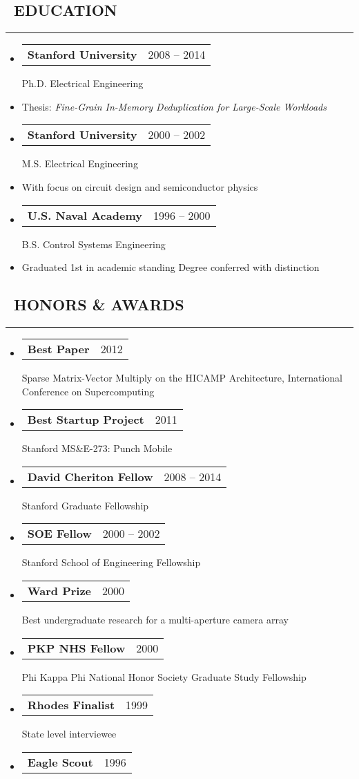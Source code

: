 \documentclass[10pt,letterpaper]{article}
\makeatletter
\newenvironment{resumesection}[1]
{%
    \subsection*{\ \textcolor{light-gray}{#1} }
    \vspace{-0.4em}
    \begin{samepage}
    \hrule
    \end{samepage}
    \vspace{+0.4em}
    \begin{itemize}[leftmargin=0.15cm]
        \parskip=0.1em
}%
{%
    \end{itemize}
}%
\newcommand{\myitem}[1]
{\item[] \textcolor{dark-gray}{#1} }
\newcommand{\headerrowx}[2]
{\item[] \begin{tabular*}{\linewidth}{l@{\extracolsep{\fill}}r}
	#1 &
	#2 \\
\end{tabular*}}
\newcommand{\headertri}[3]
{\item[] \begin{tabular*}{\linewidth}{l@{\extracolsep{\fill}}r}
\textbf{#1} & #2 \\
\end{tabular*}
#3}
\newcommand{\lminiw}{0.375}
\newcommand{\cminiw}{0.075}
\makeatother
\begin{document}
\begin{minipage}[t]{\lminiw\textwidth}
\begin{resumesection}{EDUCATION}
    \headertri
    {Stanford University}
    {2008 -- 2014}
    {Ph.D. Electrical Engineering}
    \myitem
    {Thesis: \textit{Fine-Grain In-Memory Deduplication for Large-Scale Workloads}}
    
    \headertri
    {Stanford University}
    {2000 -- 2002}
    {M.S. Electrical Engineering}
    \myitem
    {With focus on circuit design and semiconductor physics}
    
    \headertri
    {U.S. Naval Academy}
    {1996 -- 2000}
    {B.S. Control Systems Engineering}
    \myitem
    {Graduated 1st in academic standing \newline Degree conferred with distinction}
\end{resumesection}

\begin{resumesection}{HONORS \& AWARDS}
    \headertri
    {Best Paper}
    {2012}
    {Sparse Matrix-Vector Multiply on the {{HICAMP}} Architecture, International Conference on Supercomputing}
    
    \headertri
    {Best Startup Project}
    {2011}
    {Stanford MS\&E-273: Punch Mobile}
    
    \headertri
    {David Cheriton Fellow}
    {2008 -- 2014}
    {Stanford Graduate Fellowship}
    
    \headertri
    {SOE Fellow}
    {2000 -- 2002}
    {Stanford School of Engineering Fellowship}
    
    \headertri
    {Ward Prize}
    {2000}
    {Best undergraduate research for a multi-aperture camera array}
    
    \headertri
    {PKP NHS Fellow}
    {2000}
    {Phi Kappa Phi National Honor Society Graduate Study Fellowship}
    
    \headertri
    {Rhodes Finalist}
    {1999}
    {State level interviewee}
    
    \headertri
    {Eagle Scout}
    {1996}
    {}
\end{resumesection}

\end{minipage}
\begin{minipage}[t]{\cminiw\textwidth}
\end{minipage}\hfill
\end{document}
